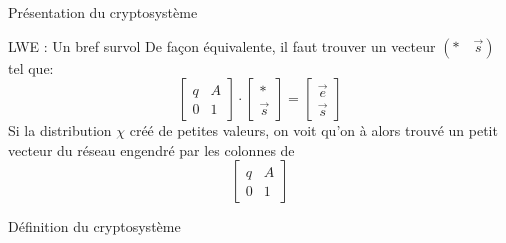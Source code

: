 \begin{section}{Présentation du cryptosystème}
\begin{subsection}{LWE : Un bref survol}
	De façon équivalente, il faut trouver un vecteur $(*\quad\vec{s})$ tel
	que:
	\[ \begin{bmatrix}q & A \\ 0 &1 \end{bmatrix}\cdot
	   \begin{bmatrix}* \\ \vec{s} \end{bmatrix} =
	   \begin{bmatrix} \vec{e} \\ \vec{s} \end{bmatrix} \]
	Si la distribution $\chi$ créé de petites valeurs, on voit qu'on à
	alors trouvé un \og petit \fg vecteur du réseau engendré par les colonnes de 
	\[ \begin{bmatrix}q & A \\ 0 &1 \end{bmatrix} \]
	\end{subsection}
	\begin{subsection}{Définition du cryptosystème}
	\end{subsection}
\end{section}
